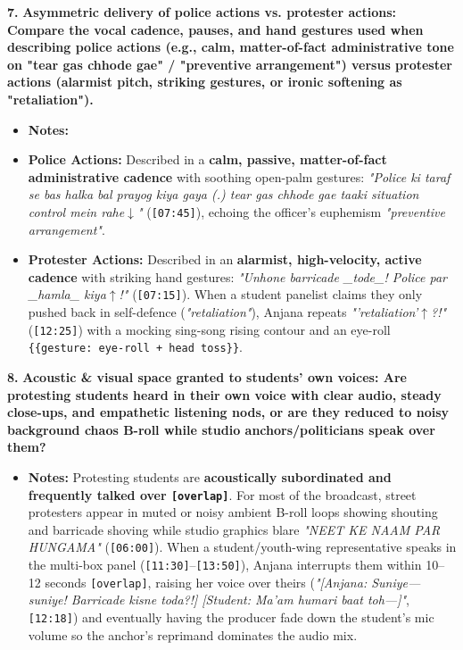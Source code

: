 \documentclass[10pt,a4paper]{article}
\begin{document}
\noindent\textbf{7.} \textbf{Asymmetric delivery of police actions vs. protester actions: Compare the vocal cadence, pauses, and hand gestures used when describing police actions (e.g., calm, matter-of-fact administrative tone on "tear gas chhode gae" / "preventive arrangement") versus protester actions (alarmist pitch, striking gestures, or ironic softening as "retaliation").}\par\smallskip
\begin{itemize}
  \item \textbf{Notes:}
  \item \textbf{Police Actions:} Described in a \textbf{calm, passive, matter-of-fact administrative cadence} with soothing open-palm gestures: \textit{"Police ki taraf se bas halka bal prayog kiya gaya (.) tear gas chhode gae taaki situation control mein rahe$\downarrow$"} (\texttt{[07:45]}), echoing the officer's euphemism \textit{"preventive arrangement"}.
  \item \textbf{Protester Actions:} Described in an \textbf{alarmist, high-velocity, active cadence} with striking hand gestures: \textit{"Unhone barricade \_tode\_! Police par \_hamla\_ kiya$\uparrow$!"} (\texttt{[07:15]}). When a student panelist claims they only pushed back in self-defence (\textit{"retaliation"}), Anjana repeats \textit{"'retaliation'$\uparrow$?!"} (\texttt{[12:25]}) with a mocking sing-song rising contour and an eye-roll \texttt{\{\{gesture: eye-roll + head toss\}\}}.
\end{itemize}

\noindent\textbf{8.} \textbf{Acoustic \& visual space granted to students' own voices: Are protesting students heard in their own voice with clear audio, steady close-ups, and empathetic listening nods, or are they reduced to noisy background chaos B-roll while studio anchors/politicians speak over them?}\par\smallskip
\begin{itemize}
  \item \textbf{Notes:}
Protesting students are \textbf{acoustically subordinated and frequently talked over \texttt{[overlap]}}. For most of the broadcast, street protesters appear in muted or noisy ambient B-roll loops showing shouting and barricade shoving while studio graphics blare \textit{"NEET KE NAAM PAR HUNGAMA"} (\texttt{[06:00]}). When a student/youth-wing representative speaks in the multi-box panel (\texttt{[11:30]}--\texttt{[13:50]}), Anjana interrupts them within 10--12 seconds \texttt{[overlap]}, raising her voice over theirs (\textit{"[Anjana: Suniye--- suniye! Barricade kisne toda?!] [Student: Ma'am humari baat toh---]"}, \texttt{[12:18]}) and eventually having the producer fade down the student's mic volume so the anchor's reprimand dominates the audio mix.\par\smallskip
\end{itemize}
\end{document}
